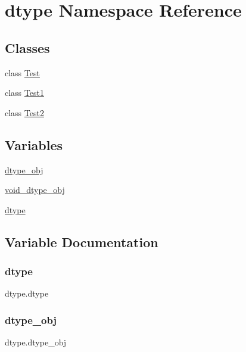\hypertarget{namespacedtype}{}\section{dtype Namespace Reference}
\label{namespacedtype}
\subsection*{Classes}
\begin{DoxyCompactItemize}
\item 
class \hyperlink{classdtype_1_1Test}{Test}
\item 
class \hyperlink{classdtype_1_1Test1}{Test1}
\item 
class \hyperlink{classdtype_1_1Test2}{Test2}
\end{DoxyCompactItemize}
\subsection*{Variables}
\begin{DoxyCompactItemize}
\item 
\hyperlink{namespacedtype_adb223ef5594545efcf29663ba0567e2c}{dtype\+\_\+obj}
\item 
\hyperlink{namespacedtype_acf5e0796443f4633ab6f30b810c6d90f}{void\+\_\+dtype\+\_\+obj}
\item 
\hyperlink{namespacedtype_a96d2cb04a23c2905e5bc586b9b8d5e83}{dtype}
\end{DoxyCompactItemize}


\subsection{Variable Documentation}
\mbox{\label{namespacedtype_a96d2cb04a23c2905e5bc586b9b8d5e83}} 
\subsubsection{\texorpdfstring{dtype}{dtype}}
{\footnotesize\ttfamily dtype.\+dtype}

\mbox{\label{namespacedtype_adb223ef5594545efcf29663ba0567e2c}} 
\subsubsection{\texorpdfstring{dtype\+\_\+obj}{dtype\_obj}}
{\footnotesize\ttfamily dtype.\+dtype\+\_\+obj}

